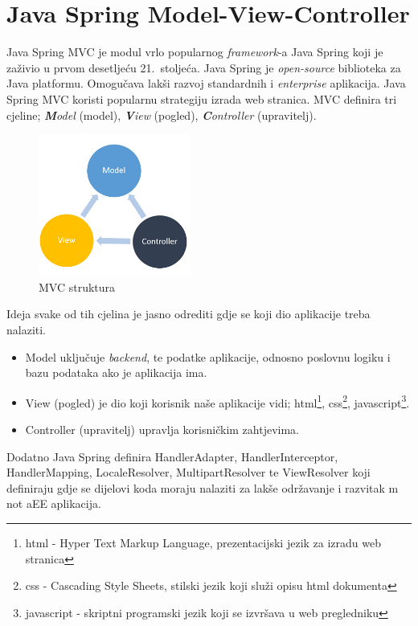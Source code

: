 \documentclass[times, utf8, zavrsni, numeric]{fer}
\begin{document}
\section{Java Spring Model-View-Controller}
\qquad Java Spring MVC je modul vrlo popularnog \textit{framework}-a\footnotemark{} Java Spring koji je zaživio u prvom desetljeću 21.~stoljeća.
Java Spring je \textit{open-source}\footnotemark{} biblioteka za Java platformu.
Omogučava lakši razvoj standardnih i \textit{enterprise}\footnotemark{} aplikacija.
Java Spring MVC koristi popularnu strategiju izrada web stranica.
MVC definira tri cjeline; \textit{\textbf{M}odel} (model), \textit{\textbf{V}iew} (pogled), \textit{\textbf{C}ontroller} (upravitelj).
\begin{figure}[htb]
				\centering
				\includegraphics[width=5cm]{images/mvc.png}
				\caption{MVC struktura}
				\label{fig:mvc}
\end{figure}

\noindent
Ideja svake od tih cjelina je jasno odrediti gdje se koji dio aplikacije treba nalaziti.
\begin{itemize}
				\item Model uključuje \textit{backend}\footnotemark{}, te podatke aplikacije, odnosno poslovnu logiku i bazu podataka ako je aplikacija ima.
	\item View (pogled) je dio koji korisnik naše aplikacije vidi; 
		html\footnote{html - Hyper Text Markup Language, prezentacijski jezik za izradu web stranica}, 
		css\footnote{css - Cascading Style Sheets, stilski jezik koji služi opisu html dokumenta}, 
		javascript\footnote{javascript - skriptni programski jezik koji se izvršava u web pregledniku}.
	\item Controller (upravitelj) upravlja korisničkim zahtjevima.
\end{itemize}
Dodatno Java Spring definira HandlerAdapter, HandlerInterceptor, HandlerMapping, LocaleResolver, MultipartResolver te ViewResolver koji definiraju gdje se dijelovi koda moraju nalaziti za lakše održavanje i razvitak m not aEE aplikacija.
\end{document}
